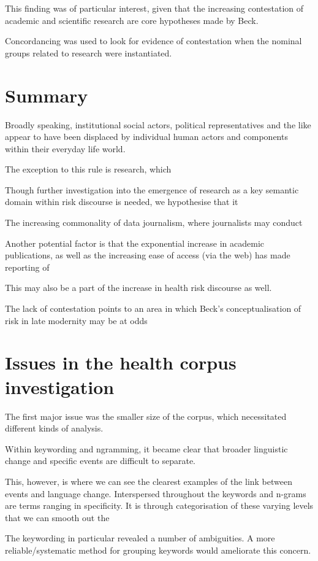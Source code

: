 This finding was of particular interest, given that the increasing contestation of academic and scientific research are core hypotheses made by Beck.

Concordancing was used to look for evidence of contestation when the nominal groups related to research were instantiated.

\section{Summary}

Broadly speaking, institutional social actors, political representatives and the like appear to have been displaced by individual human actors and components within their everyday life world.

The exception to this rule is research, which

Though further investigation into the emergence of research as a key semantic domain within risk discourse is needed, we hypothesise that it

The increasing commonality of data journalism, where journalists may conduct

Another potential factor is that the exponential increase in academic publications, as well as the increasing ease of access (via the web) has made reporting of 

This may also be a part of the increase in health risk discourse as well.

The lack of contestation points to an area in which Beck's conceptualisation of risk in late modernity may be at odds




\section{Issues in the health corpus investigation}

The first major issue was the smaller size of the corpus, which necessitated different kinds of analysis.

Within keywording and ngramming, it became clear that broader linguistic change and specific events are difficult to separate.

This, however, is where we can see the clearest examples of the link between events and language change. Interspersed throughout the keywords and n-grams are terms ranging in specificity. It is through categorisation of these varying levels that we can smooth out the 

The keywording in particular revealed a number of ambiguities. A more reliable\slash systematic method for grouping keywords would ameliorate this concern.

